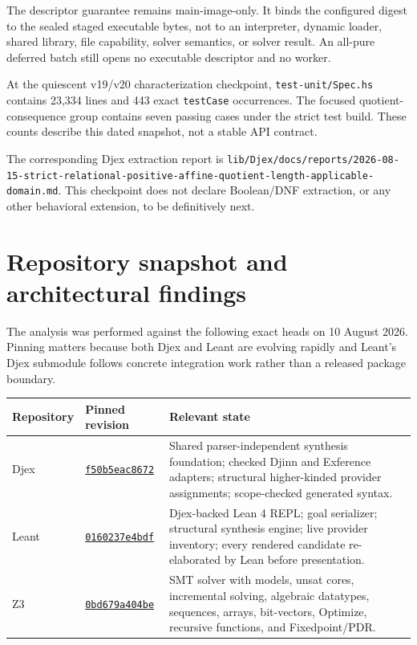 \documentclass[11pt,oneside]{article}
\newcommand{\repo}[1]{\textsf{#1}}
\newcommand{\code}[1]{\texttt{#1}}
\newcommand{\filepath}[1]{\nolinkurl{#1}}
\begin{document}
The descriptor guarantee remains main-image-only.  It binds the configured digest to
the sealed staged executable bytes, not to an interpreter, dynamic loader, shared
library, file capability, solver semantics, or solver result.  An all-pure deferred
batch still opens no executable descriptor and no worker.

At the quiescent v19/v20 characterization checkpoint,
\filepath{test-unit/Spec.hs} contains 23,334 lines and 443 exact
\code{testCase} occurrences.  The focused quotient-consequence group contains seven
passing cases under the strict test build.  These counts describe this dated snapshot,
not a stable API contract.

The corresponding Djex extraction report is
\filepath{lib/Djex/docs/reports/2026-08-15-strict-relational-positive-affine-quotient-length-applicable-domain.md}.
This checkpoint does not declare Boolean/DNF extraction, or any other behavioral
extension, to be definitively next.

\section{Repository snapshot and architectural findings}
\label{sec:snapshot}

The analysis was performed against the following exact heads on 10 August 2026.
Pinning matters because both Djex and Leant are evolving rapidly and Leant's Djex
submodule follows concrete integration work rather than a released package boundary.

\begin{longtable}{@{}p{}p{}p{}@{}}
\toprule
\textbf{Repository} & \textbf{Pinned revision} & \textbf{Relevant state} \\
\midrule
\endhead
\repo{Djex} &
\href{https://github.com/VladimirReshetnikov/Djex/tree/f50b5eac86726c7530d95e48c27101b7c0fa25c9}{\texttt{f50b5eac8672}} &
Shared parser-independent synthesis foundation; checked Djinn and Exference adapters;
structural higher-kinded provider assignments; scope-checked generated syntax. \\
\repo{Leant} &
\href{https://github.com/VladimirReshetnikov/Leant/tree/0160237e4bdf6e342a55f5a86ce5d5292728024f}{\texttt{0160237e4bdf}} &
Djex-backed Lean 4 REPL; goal serializer; structural synthesis engine; live provider
inventory; every rendered candidate re-elaborated by Lean before presentation. \\
\repo{Z3} &
\href{https://github.com/Z3Prover/z3/tree/0bd679a404bee551393fd94ca813ccc7eb034973}{\texttt{0bd679a404be}} &
SMT solver with models, unsat cores, incremental solving, algebraic datatypes,
sequences, arrays, bit-vectors, Optimize, recursive functions, and Fixedpoint/PDR. \\
\bottomrule
\end{longtable}
\end{document}
